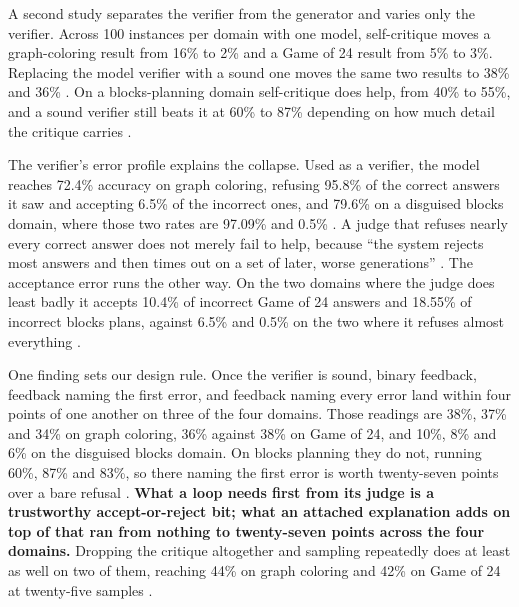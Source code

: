 A second study separates the verifier from the generator and varies only the verifier. Across 100
instances per domain with one model, self-critique moves a graph-coloring result from 16\% to 2\%
and a Game of 24 result from 5\% to 3\%. Replacing the model verifier with a sound one moves the
same two results to 38\% and 36\% \citep[Table~1]{stechly2025selfverification}. On a
blocks-planning domain self-critique does help, from 40\% to 55\%, and a sound verifier still beats
it at 60\% to 87\% depending on how much detail the critique carries
\citep[Table~1]{stechly2025selfverification}.

The verifier's error profile explains the collapse. Used as a verifier, the model reaches 72.4\%
accuracy on graph coloring, refusing 95.8\% of the correct answers it saw and accepting 6.5\% of the
incorrect ones, and 79.6\% on a disguised blocks domain, where those two rates are 97.09\% and 0.5\%
\citep[Table~2]{stechly2025selfverification}. A judge
that refuses nearly every correct answer does not merely fail to help, because ``the system rejects
most answers and then times out on a set of later, worse generations''
\citep[\S5]{stechly2025selfverification}. The acceptance error runs the other way. On the two
domains where the judge does least badly it accepts 10.4\% of incorrect Game of 24 answers and
18.55\% of incorrect blocks plans, against 6.5\% and 0.5\% on the two where it refuses almost
everything \citep[Table~2]{stechly2025selfverification}.

One finding sets our design rule. Once the verifier is sound, binary feedback, feedback naming the
first error, and feedback naming every error land within four points of one another on three of the
four domains. Those readings are 38\%, 37\% and 34\% on graph coloring, 36\% against 38\% on Game of
24, and 10\%, 8\% and 6\% on the disguised blocks domain. On blocks planning they do not, running 60\%, 87\% and
83\%, so there naming the first error is worth twenty-seven points over a bare refusal
\citep[Table~1]{stechly2025selfverification}. \textbf{What a loop needs first from its judge is a
trustworthy accept-or-reject bit; what an attached explanation adds on top of that ran from nothing
to twenty-seven points across the four domains.} Dropping the critique altogether and sampling
repeatedly does at least as well on two of them, reaching 44\% on graph coloring and 42\% on Game of
24 at twenty-five samples \citep[Table~1]{stechly2025selfverification}.

